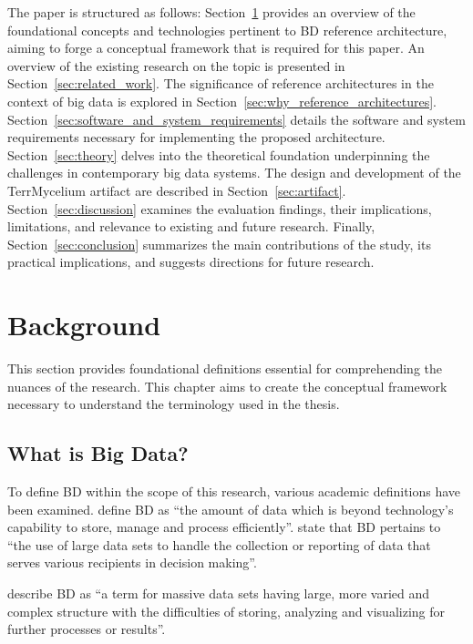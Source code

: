 \documentclass[preprint,12pt]{elsarticle}
\begin{document}
The paper is structured as follows: Section~\ref{sec:background} provides an overview of the foundational concepts and technologies pertinent to BD reference architecture, aiming to forge a conceptual framework that is required for this paper. An overview of the existing research on the topic is presented in Section~\ref{sec:related_work}. The significance of reference architectures in the context of big data is explored in Section~\ref{sec:why_reference_architectures}. Section~\ref{sec:software_and_system_requirements} details the software and system requirements necessary for implementing the proposed architecture. Section~\ref{sec:theory} delves into the theoretical foundation underpinning the challenges in contemporary big data systems. The design and development of the TerrMycelium artifact are described in Section~\ref{sec:artifact}. Section~\ref{sec:discussion} examines the evaluation findings, their implications, limitations, and relevance to existing and future research. Finally, Section~\ref{sec:conclusion} summarizes the main contributions of the study, its practical implications, and suggests directions for future research.


\section{Background}
\label{sec:background}

This section provides foundational definitions essential for comprehending the nuances of the research. This chapter aims to create the conceptual framework necessary to understand the terminology used in the thesis.

\subsection{What is Big Data?}

To define BD within the scope of this research, various academic definitions have been examined. \citet{Kaisler2013} define BD as ``the amount of data which is beyond technology’s capability to store, manage and process efficiently''.
\citet{Srivastava2018} state that BD pertains to ``the use of large data sets to handle the collection or reporting of data that serves various recipients in decision making''.

\citet{Sagiroglu2013} describe BD as ``a term for massive data sets having large, more varied and complex structure with the difficulties of storing, analyzing and visualizing for further processes or results''. 
\end{document}
